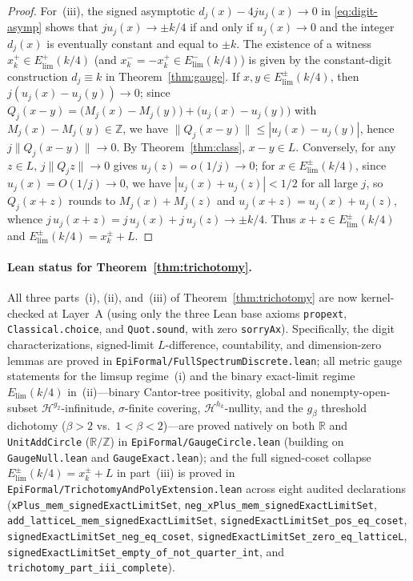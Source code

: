 \documentclass[11pt]{article}
\theoremstyle{definition}
\theoremstyle{remark}
\newcommand{\R}{\mathbb{R}}
\newcommand{\Z}{\mathbb{Z}}
\begin{document}
\begin{proof}
For~(iii), the signed asymptotic $d_j(x)-4ju_j(x)\to0$ in
\eqref{eq:digit-asymp} shows that $ju_j(x)\to\pm k/4$ if and only if
$u_j(x)\to0$ and the integer $d_j(x)$ is eventually constant and equal to
$\pm k$. The existence of a witness $x_k^+\in E_{\mathrm{lim}}^+(k/4)$ (and
$x_k^-=-x_k^+\in E_{\mathrm{lim}}^-(k/4)$) is given by the constant-digit
construction $d_j\equiv k$ in Theorem~\ref{thm:gauge}. If
$x,y\in E_{\mathrm{lim}}^\pm(k/4)$, then $j(u_j(x)-u_j(y))\to0$; since
$Q_j(x-y)=\bigl(M_j(x)-M_j(y)\bigr)+\bigl(u_j(x)-u_j(y)\bigr)$ with
$M_j(x)-M_j(y)\in\Z$, we have $\|Q_j(x-y)\|\le|u_j(x)-u_j(y)|$, hence
$j\|Q_j(x-y)\|\to0$. By Theorem~\ref{thm:class}, $x-y\in L$. Conversely, for
any $z\in L$, $j\|Q_jz\|\to0$ gives $u_j(z)=o(1/j)\to0$; for
$x\in E_{\mathrm{lim}}^\pm(k/4)$, since $u_j(x)=O(1/j)\to0$, we have
$|u_j(x)+u_j(z)|<1/2$ for all large $j$, so $Q_j(x+z)$ rounds to
$M_j(x)+M_j(z)$ and $u_j(x+z)=u_j(x)+u_j(z)$, whence
$j\,u_j(x+z)=j\,u_j(x)+j\,u_j(z)\to\pm k/4$. Thus $x+z\in E_{\mathrm{lim}}^\pm(k/4)$
and $E_{\mathrm{lim}}^\pm(k/4)=x_k^\pm+L$.
\end{proof}

\paragraph{Lean status for Theorem~\ref{thm:trichotomy}.}
All three parts~(i), (ii), and~(iii) of Theorem~\ref{thm:trichotomy} are now
kernel-checked at Layer~A (using only the three Lean base axioms
\texttt{propext}, \texttt{Classical.choice}, and \texttt{Quot.sound}, with zero
\texttt{sorryAx}). Specifically, the digit characterizations, signed-limit
$L$-difference, countability, and dimension-zero lemmas are proved in
\texttt{EpiFormal/\allowbreak Full\allowbreak Spectrum\allowbreak Discrete.lean};
all metric gauge statements for the limsup regime~(i) and the binary exact-limit
regime $E_{\mathrm{lim}}(k/4)$ in~(ii)---binary Cantor-tree positivity, global
and nonempty-open-subset $\mathcal H^{g_2}$-infinitude, $\sigma$-finite
covering, $\mathcal H^{h_k}$-nullity, and the $g_\beta$ threshold dichotomy
($\beta>2$ vs.\ $1<\beta<2$)---are proved natively on both $\R$ and
\texttt{UnitAddCircle} ($\R/\Z$) in
\texttt{EpiFormal/\allowbreak GaugeCircle.lean} (building on
\texttt{GaugeNull.lean} and \texttt{GaugeExact.lean}); and the full
signed-coset collapse $E_{\mathrm{lim}}^\pm(k/4)=x_k^\pm+L$ in part~(iii) is
proved in
\texttt{EpiFormal/\allowbreak TrichotomyAndPolyExtension.lean} across eight
audited declarations (\texttt{xPlus\_\allowbreak mem\_\allowbreak signedExactLimitSet},
\texttt{neg\_\allowbreak xPlus\_\allowbreak mem\_\allowbreak signedExactLimitSet},
\texttt{add\_\allowbreak latticeL\_\allowbreak mem\_\allowbreak signedExactLimitSet},
\texttt{signedExactLimitSet\_\allowbreak pos\_\allowbreak eq\_\allowbreak coset},
\texttt{signedExactLimitSet\_\allowbreak neg\_\allowbreak eq\_\allowbreak coset},
\texttt{signedExactLimitSet\_\allowbreak zero\_\allowbreak eq\_\allowbreak latticeL},
\texttt{signedExactLimitSet\_\allowbreak empty\_\allowbreak of\_\allowbreak not\_\allowbreak quarter\_\allowbreak int},
and \texttt{trichotomy\_\allowbreak part\_\allowbreak iii\_\allowbreak complete}).
\end{document}
